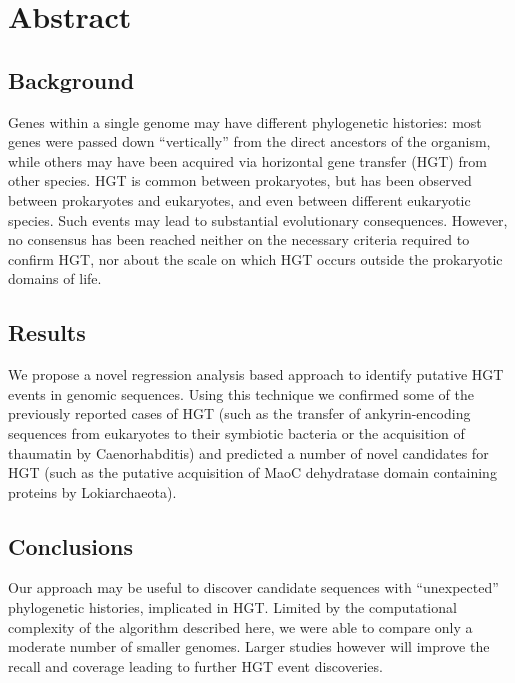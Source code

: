 \section{Abstract}
\subsection{Background}
Genes within a single genome may have different phylogenetic histories: most genes were passed down “vertically” from the direct ancestors of the organism, while others may have been acquired via horizontal gene transfer (HGT) from other species. HGT is common between prokaryotes, but has been observed between prokaryotes and eukaryotes, and even between different eukaryotic species. Such events may lead to substantial evolutionary consequences. However, no consensus has been reached neither on the necessary criteria required to confirm HGT, nor about the scale on which HGT occurs outside the prokaryotic domains of life.
\subsection{Results}
We propose a novel regression analysis based approach to identify putative HGT events in genomic sequences. Using this technique we confirmed some of the previously reported cases of HGT (such as the transfer of ankyrin-encoding sequences from eukaryotes to their symbiotic bacteria or the acquisition of thaumatin by Caenorhabditis) and predicted a number of novel candidates for HGT (such as the putative acquisition of MaoC dehydratase domain containing proteins by Lokiarchaeota).
\subsection{Conclusions}
Our approach may be useful to discover candidate sequences with “unexpected” phylogenetic histories, implicated in HGT. Limited by the computational complexity of the algorithm described here, we were able to compare only a moderate number of smaller genomes. Larger studies however will improve the recall and coverage leading to further HGT event discoveries.
